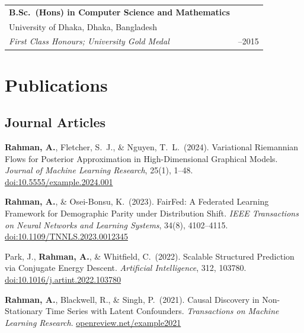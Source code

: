 \documentclass[a4paper,11pt]{article}
\makeatletter
\newcommand{\cventry}[2]{%
  \begin{tabularx}{\linewidth}{@{}X@{\hspace{4pt}}>{\raggedleft\arraybackslash}p{4.6cm}@{}}
    #1 & #2 \\
  \end{tabularx}%
}
\newcommand{\entrysep}{\vspace{3pt}}
\newcommand{\me}[1]{\textbf{#1}}
\makeatother
\begin{document}
\entrysep

\cventry{%
  \textbf{B.Sc.\ (Hons) in Computer Science and Mathematics}\\
  University of Dhaka, Dhaka, Bangladesh\\
  \textit{First Class Honours; University Gold Medal}
}{2011--2015}

\section{Publications}

\subsection*{\normalsize\color{accent} Journal Articles}
\vspace{2pt}

\begin{enumerate}[leftmargin=*, label={[\arabic*]}, itemsep=4pt]

\item \me{Rahman, A.}, Fletcher, S.~J., \& Nguyen, T.~L.\ (2024).
  Variational Riemannian Flows for Posterior Approximation in High-Dimensional
  Graphical Models.
  \textit{Journal of Machine Learning Research}, 25(1), 1--48.
  \href{https://doi.org/10.5555/example.2024.001}{doi:10.5555/example.2024.001}

\item \me{Rahman, A.}, \& Osei-Bonsu, K.\ (2023).
  FairFed: A Federated Learning Framework for Demographic Parity under
  Distribution Shift.
  \textit{IEEE Transactions on Neural Networks and Learning Systems}, 34(8),
  4102--4115.
  \href{https://doi.org/10.1109/TNNLS.2023.0012345}{doi:10.1109/TNNLS.2023.0012345}

\item Park, J., \me{Rahman, A.}, \& Whitfield, C.\ (2022).
  Scalable Structured Prediction via Conjugate Energy Descent.
  \textit{Artificial Intelligence}, 312, 103780.
  \href{https://doi.org/10.1016/j.artint.2022.103780}{doi:10.1016/j.artint.2022.103780}

\item \me{Rahman, A.}, Blackwell, R., \& Singh, P.\ (2021).
  Causal Discovery in Non-Stationary Time Series with Latent Confounders.
  \textit{Transactions on Machine Learning Research}.
  \href{https://openreview.net/example2021}{openreview.net/example2021}

\end{enumerate}
\end{document}
